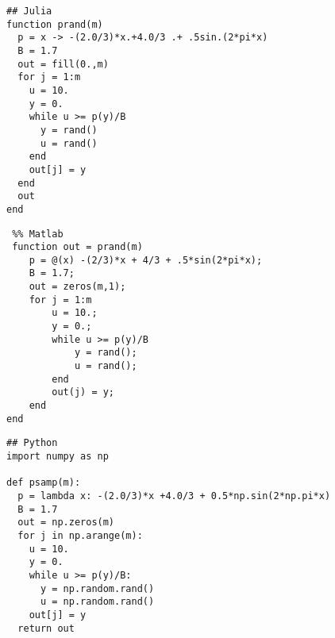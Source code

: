 \documentclass[10pt]{amsart}
\begin{document}
\begin{enumerate}[label={\bf Problem~{\arabic*}:}]
   \mline
\begin{lstlisting}
## Julia
function prand(m)
  p = x -> -(2.0/3)*x.+4.0/3 .+ .5sin.(2*pi*x)
  B = 1.7
  out = fill(0.,m)
  for j = 1:m
    u = 10.
    y = 0.
    while u >= p(y)/B
      y = rand()
      u = rand()
    end
    out[j] = y
  end
  out     
end
  \end{lstlisting}
    \begin{lstlisting}
 %% Matlab
 function out = prand(m) 
    p = @(x) -(2/3)*x + 4/3 + .5*sin(2*pi*x);
    B = 1.7;
    out = zeros(m,1);
    for j = 1:m
        u = 10.;
        y = 0.;
        while u >= p(y)/B
            y = rand();
            u = rand();
        end
        out(j) = y;
    end     
end
  \end{lstlisting}
  \begin{lstlisting}
## Python
import numpy as np
    
def psamp(m):
  p = lambda x: -(2.0/3)*x +4.0/3 + 0.5*np.sin(2*np.pi*x)
  B = 1.7
  out = np.zeros(m)
  for j in np.arange(m):
    u = 10.
    y = 0.
    while u >= p(y)/B:
      y = np.random.rand()
      u = np.random.rand()
    out[j] = y
  return out
\end{lstlisting}

  
    
  \end{enumerate}
\end{document}
